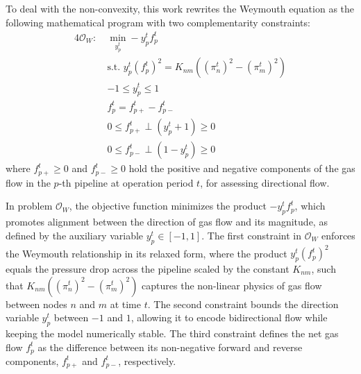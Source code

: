 To deal with the non-convexity, this work rewrites the Weymouth equation as the following mathematical program with two complementarity constraints:
\begin{alignat}{4}
\label{eq:complementarity_relaxec3}
\mathcal{O}_W: \ &\min\limits_{y_p^t} -y_p^tf_{p}^t \\
& \text{s.t. } y_p^t(f_{p}^t)^2 = K_{nm}((\pi_{n}^t)^2-(\pi_{m}^t)^2)\nonumber\\
& -1 \leq y_p^t \leq 1 \nonumber\\
&f_{p}^t = f_{p+}^t - f_{p-}^t\nonumber\\
& 0 \leq f_{p+}^t \perp (y_p^t+1) \geq 0 \nonumber\\
& 0 \leq f_{p-}^t \perp (1-y_p^t) \geq 0 \nonumber
\end{alignat}
where $f_{p+}^t\geq0$ and $f_{p-}^t\geq0$ hold the positive and negative components of the gas flow in the $p$-th pipeline at operation period $t$, for assessing directional flow.


In problem $\mathcal{O}_W$, the objective function minimizes the product $-y_p^t f_p^t$, which promotes alignment between the direction of gas flow and its magnitude, as defined by the auxiliary variable $y_p^t \in [-1,1]$. The first constraint in $\mathcal{O}_W$ enforces the Weymouth relationship in its relaxed form, where the product $y_p^t (f_p^t)^2$ equals the pressure drop across the pipeline scaled by the constant $K_{nm}$, such that $K_{nm}((\pi_n^t)^2 - (\pi_m^t)^2)$ captures the non-linear physics of gas flow between nodes $n$ and $m$ at time $t$. The second constraint bounds the direction variable $y_p^t$ between $-1$ and $1$, allowing it to encode bidirectional flow while keeping the model numerically stable. The third constraint defines the net gas flow $f_p^t$ as the difference between its non-negative forward and reverse components, $f_{p+}^t$ and $f_{p-}^t$, respectively. 

